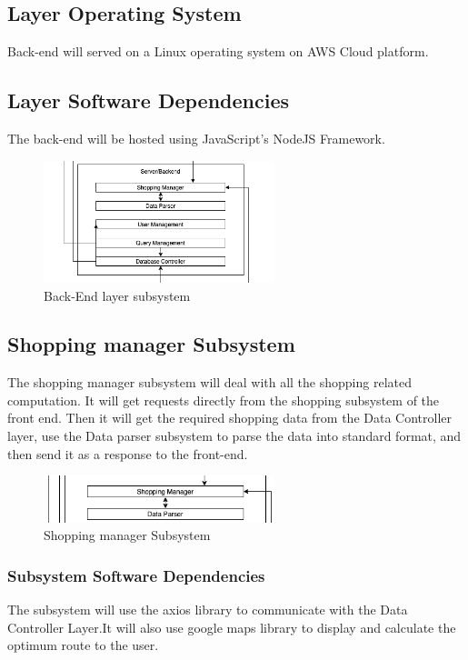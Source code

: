 
\subsection{Layer Operating System}
Back-end will served on a Linux operating system on AWS Cloud platform.
\subsection{Layer Software Dependencies}
The back-end will be hosted using JavaScript's NodeJS Framework.
\begin{figure}[h!]
	\centering
 	\includegraphics[width=0.60\textwidth]{images/backend}
 \caption{Back-End layer subsystem}
\end{figure}

\subsection{Shopping manager Subsystem}
The shopping manager subsystem will deal with all the shopping related computation. It will get requests
directly from the shopping subsystem of the front end. Then it will get the required shopping data
from the Data Controller layer, use the Data parser subsystem to parse the data into standard format,
and then send it as a response to the front-end.

\begin{figure}[h!]
	\centering
 	\includegraphics[width=0.60\textwidth]{images/ShoppingManager.png}
 \caption{Shopping manager Subsystem}
\end{figure}


\subsubsection{Subsystem Software Dependencies}
The subsystem will use the axios library to communicate with the Data Controller Layer.It will also use google maps library to display and calculate the optimum route to the user.


